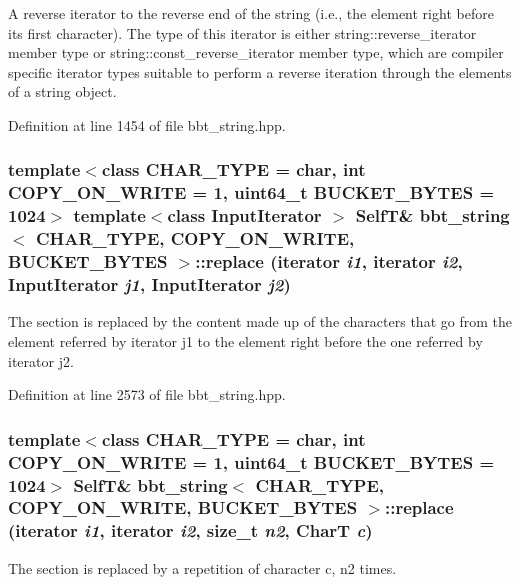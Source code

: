 A reverse iterator to the reverse end of the string (i.e., the element right before its first character). The type of this iterator is either string::reverse\_\-iterator member type or string::const\_\-reverse\_\-iterator member type, which are compiler specific iterator types suitable to perform a reverse iteration through the elements of a string object. 

Definition at line 1454 of file bbt\_\-string.hpp.\hypertarget{classbbt__string_8bf848ea75290e5ddfe4983b71919efb}{
\subsubsection[{replace}]{\setlength{\rightskip}{0pt plus 5cm}template$<$class CHAR\_\-TYPE  = char, int COPY\_\-ON\_\-WRITE = 1, uint64\_\-t BUCKET\_\-BYTES = 1024$>$ template$<$class InputIterator $>$ {\bf SelfT}\& {\bf bbt\_\-string}$<$ CHAR\_\-TYPE, COPY\_\-ON\_\-WRITE, BUCKET\_\-BYTES $>$::replace (iterator {\em i1}, \/  iterator {\em i2}, \/  InputIterator {\em j1}, \/  InputIterator {\em j2})}}
\label{classbbt__string_8bf848ea75290e5ddfe4983b71919efb}


The section is replaced by the content made up of the characters that go from the element referred by iterator j1 to the element right before the one referred by iterator j2. 

Definition at line 2573 of file bbt\_\-string.hpp.\hypertarget{classbbt__string_7125b62da40b819bc3780a759664f668}{
\subsubsection[{replace}]{\setlength{\rightskip}{0pt plus 5cm}template$<$class CHAR\_\-TYPE  = char, int COPY\_\-ON\_\-WRITE = 1, uint64\_\-t BUCKET\_\-BYTES = 1024$>$ {\bf SelfT}\& {\bf bbt\_\-string}$<$ CHAR\_\-TYPE, COPY\_\-ON\_\-WRITE, BUCKET\_\-BYTES $>$::replace (iterator {\em i1}, \/  iterator {\em i2}, \/  size\_\-t {\em n2}, \/  CharT {\em c})}}
\label{classbbt__string_7125b62da40b819bc3780a759664f668}


The section is replaced by a repetition of character c, n2 times. 

